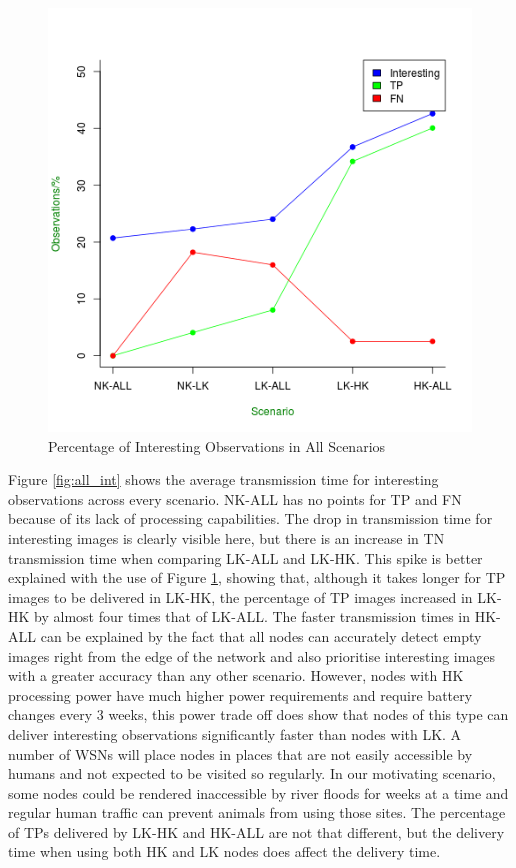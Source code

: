 \begin{figure}[!h]
\centering
\includegraphics[width=\textwidth]{Chap7/figures/all_int_percent.png}
\caption{Percentage of Interesting Observations in All Scenarios}
\label{fig:all_int_percent}
\end{figure}

Figure \ref{fig:all_int} shows the average transmission time for interesting observations across every scenario. NK-ALL has no points for TP and FN because of its lack of processing capabilities. The drop in transmission time for interesting images is clearly visible here, but there is an increase in TN transmission time when comparing LK-ALL and LK-HK. This spike is better explained with the use of Figure \ref{fig:all_int_percent}, showing that, although it takes longer for TP images to be delivered in LK-HK, the percentage of TP images increased in LK-HK by almost four times that of LK-ALL. The faster transmission times in HK-ALL can be explained by the fact that all nodes can accurately detect empty images right from the edge of the network and also prioritise interesting images with a greater accuracy than any other scenario. However, nodes with HK processing power have much higher power requirements and require battery changes every 3 weeks, this power trade off does show that nodes of this type can deliver interesting observations significantly faster than nodes with LK. A number of WSNs will place nodes in places that are not easily accessible by humans and not expected to be visited so regularly. In our motivating scenario, some nodes could be rendered inaccessible by river floods for weeks at a time and regular human traffic can prevent animals from using those sites. The percentage of TPs delivered by LK-HK and HK-ALL are not that different, but the delivery time when using both HK and LK nodes does affect the delivery time. 

